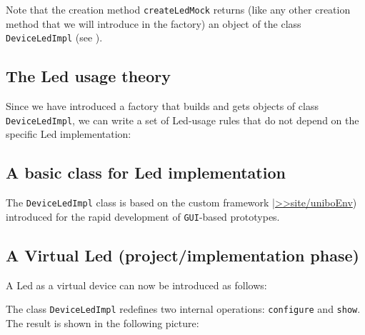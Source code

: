 Note that the creation method \texttt{createLedMock} returns (like any other creation method that we will introduce in the factory) an object of the class \texttt{DeviceLedImpl} (see   ). 

\subsection{The Led usage theory }
Since we have introduced a factory that builds and gets objects of class  \texttt{DeviceLedImpl}, we can write a set of Led-usage rules that do not depend on the specific Led implementation:



\subsection{A basic class for Led implementation}
The \texttt{DeviceLedImpl} class is based on the custom framework \href{https://137.204.107.21/syskb/it.unibo.iss2015intro/docs/Frameworks/FramwCustomAppl.html}{|>>site/uniboEnv}) introduced for the rapid development of \texttt{GUI}-based prototypes.




\subsection{A Virtual Led (project/implementation phase)}

A Led as a virtual device can now be introduced as follows:


The class  \texttt{DeviceLedImpl} redefines two internal operations: \texttt{configure} and \texttt{show}. The result is shown in the following picture:


